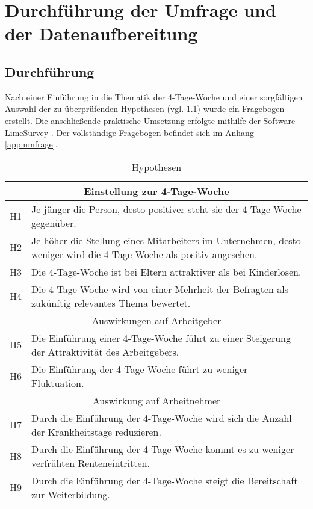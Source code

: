 \chapter{Durchführung der Umfrage und der Datenaufbereitung}


 
\section{Durchführung}

Nach einer Einführung in die Thematik der 4-Tage-Woche und einer sorgfältigen Auswahl der zu 
überprüfenden Hypothesen (vgl. \ref{tab:hyptothesen}) wurde ein Fragebogen erstellt.
Die anschließende praktische Umsetzung erfolgte mithilfe der Software LimeSurvey 
\parencite[vgl.][]{limesurvey_gmbh_limesurvey_nodate}. Der vollständige Fragebogen befindet sich im Anhang \ref{app:umfrage}.

\begin{table}
    \centering
      \begin{tabular}{|l|p{}|}
      \hline
      \multicolumn{2}{|c|}{Einstellung zur 4-Tage-Woche} \\ \hline
      H1 & Je jünger die Person, desto positiver steht sie der 4-Tage-Woche gegenüber. \\ \hline
      H2 & Je höher die Stellung eines Mitarbeiters im Unternehmen, desto weniger wird die 4-Tage-Woche als positiv angesehen. \\ \hline
      H3 & Die 4-Tage-Woche ist bei Eltern attraktiver als bei Kinderlosen. \\ \hline
      H4 & Die 4-Tage-Woche wird von einer Mehrheit der Befragten als zukünftig relevantes Thema bewertet. \\ \hline
      \multicolumn{2}{|c|}{Auswirkungen auf Arbeitgeber} \\ \hline
      H5 & Die Einführung einer 4-Tage-Woche führt zu einer Steigerung der Attraktivität des Arbeitgebers. \\ \hline
      H6 & Die Einführung der 4-Tage-Woche führt zu weniger Fluktuation. \\ \hline
      \multicolumn{2}{|c|}{Auswirkung auf Arbeitnehmer} \\ \hline
      H7 & Durch die Einführung der 4-Tage-Woche wird sich die Anzahl der Krankheitstage reduzieren. \\ \hline
      H8 & Durch die Einführung der 4-Tage-Woche kommt es zu weniger verfrühten Renteneintritten. \\ \hline
      H9 & Durch die Einführung der 4-Tage-Woche steigt die Bereitschaft zur Weiterbildung. \\ \hline
      \end{tabular}
      \caption{Hypothesen}
      \label{tab:hyptothesen}
\end{table}

